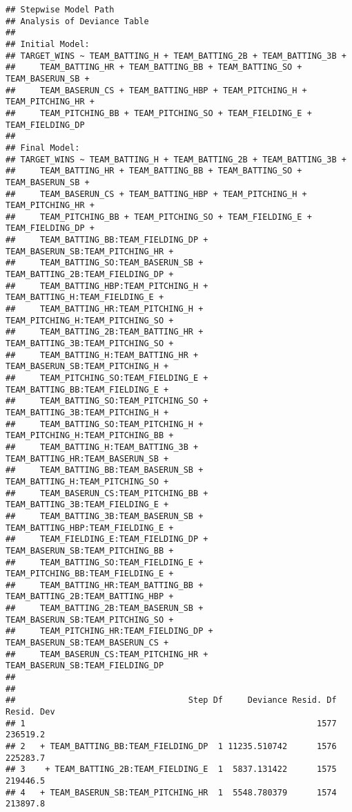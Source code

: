 \documentclass[
]{article}
\begin{document}
\begin{verbatim}
## Stepwise Model Path 
## Analysis of Deviance Table
## 
## Initial Model:
## TARGET_WINS ~ TEAM_BATTING_H + TEAM_BATTING_2B + TEAM_BATTING_3B + 
##     TEAM_BATTING_HR + TEAM_BATTING_BB + TEAM_BATTING_SO + TEAM_BASERUN_SB + 
##     TEAM_BASERUN_CS + TEAM_BATTING_HBP + TEAM_PITCHING_H + TEAM_PITCHING_HR + 
##     TEAM_PITCHING_BB + TEAM_PITCHING_SO + TEAM_FIELDING_E + TEAM_FIELDING_DP
## 
## Final Model:
## TARGET_WINS ~ TEAM_BATTING_H + TEAM_BATTING_2B + TEAM_BATTING_3B + 
##     TEAM_BATTING_HR + TEAM_BATTING_BB + TEAM_BATTING_SO + TEAM_BASERUN_SB + 
##     TEAM_BASERUN_CS + TEAM_BATTING_HBP + TEAM_PITCHING_H + TEAM_PITCHING_HR + 
##     TEAM_PITCHING_BB + TEAM_PITCHING_SO + TEAM_FIELDING_E + TEAM_FIELDING_DP + 
##     TEAM_BATTING_BB:TEAM_FIELDING_DP + TEAM_BASERUN_SB:TEAM_PITCHING_HR + 
##     TEAM_BATTING_SO:TEAM_BASERUN_SB + TEAM_BATTING_2B:TEAM_FIELDING_DP + 
##     TEAM_BATTING_HBP:TEAM_PITCHING_H + TEAM_BATTING_H:TEAM_FIELDING_E + 
##     TEAM_BATTING_HR:TEAM_PITCHING_H + TEAM_PITCHING_H:TEAM_PITCHING_SO + 
##     TEAM_BATTING_2B:TEAM_BATTING_HR + TEAM_BATTING_3B:TEAM_PITCHING_SO + 
##     TEAM_BATTING_H:TEAM_BATTING_HR + TEAM_BASERUN_SB:TEAM_PITCHING_H + 
##     TEAM_PITCHING_SO:TEAM_FIELDING_E + TEAM_BATTING_BB:TEAM_FIELDING_E + 
##     TEAM_BATTING_SO:TEAM_PITCHING_SO + TEAM_BATTING_3B:TEAM_PITCHING_H + 
##     TEAM_BATTING_SO:TEAM_PITCHING_H + TEAM_PITCHING_H:TEAM_PITCHING_BB + 
##     TEAM_BATTING_H:TEAM_BATTING_3B + TEAM_BATTING_HR:TEAM_BASERUN_SB + 
##     TEAM_BATTING_BB:TEAM_BASERUN_SB + TEAM_BATTING_H:TEAM_PITCHING_SO + 
##     TEAM_BASERUN_CS:TEAM_PITCHING_BB + TEAM_BATTING_3B:TEAM_FIELDING_E + 
##     TEAM_BATTING_3B:TEAM_BASERUN_SB + TEAM_BATTING_HBP:TEAM_FIELDING_E + 
##     TEAM_FIELDING_E:TEAM_FIELDING_DP + TEAM_BASERUN_SB:TEAM_PITCHING_BB + 
##     TEAM_BATTING_SO:TEAM_FIELDING_E + TEAM_PITCHING_BB:TEAM_FIELDING_E + 
##     TEAM_BATTING_HR:TEAM_BATTING_BB + TEAM_BATTING_2B:TEAM_BATTING_HBP + 
##     TEAM_BATTING_2B:TEAM_BASERUN_SB + TEAM_BASERUN_SB:TEAM_PITCHING_SO + 
##     TEAM_PITCHING_HR:TEAM_FIELDING_DP + TEAM_BASERUN_SB:TEAM_BASERUN_CS + 
##     TEAM_BASERUN_CS:TEAM_PITCHING_HR + TEAM_BASERUN_SB:TEAM_FIELDING_DP
## 
## 
##                                   Step Df     Deviance Resid. Df Resid. Dev
## 1                                                           1577   236519.2
## 2   + TEAM_BATTING_BB:TEAM_FIELDING_DP  1 11235.510742      1576   225283.7
## 3    + TEAM_BATTING_2B:TEAM_FIELDING_E  1  5837.131422      1575   219446.5
## 4   + TEAM_BASERUN_SB:TEAM_PITCHING_HR  1  5548.780379      1574   213897.8

\end{verbatim}
\end{document}
